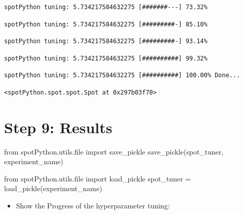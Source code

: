 \documentclass[
  letterpaper,
  DIV=11,
  numbers=noendperiod]{scrreprt}
\newenvironment{Shaded}{\begin{snugshade}}{\end{snugshade}}
\newcommand{\BuiltInTok}[1]{\textcolor[rgb]{0.00,0.23,0.31}{#1}}
\newcommand{\ImportTok}[1]{\textcolor[rgb]{0.00,0.46,0.62}{#1}}
\newcommand{\NormalTok}[1]{\textcolor[rgb]{0.00,0.23,0.31}{#1}}
\newcommand{\OperatorTok}[1]{\textcolor[rgb]{0.37,0.37,0.37}{#1}}
\providecommand{\tightlist}{%
  \setlength{\itemsep}{0pt}\setlength{\parskip}{0pt}}\usepackage{longtable,booktabs,array}
\begin{document}
\begin{verbatim}
spotPython tuning: 5.734217584632275 [#######---] 73.32% 
\end{verbatim}

\begin{verbatim}
spotPython tuning: 5.734217584632275 [#########-] 85.10% 
\end{verbatim}

\begin{verbatim}
spotPython tuning: 5.734217584632275 [#########-] 93.14% 
\end{verbatim}

\begin{verbatim}
spotPython tuning: 5.734217584632275 [##########] 99.32% 
\end{verbatim}

\begin{verbatim}
spotPython tuning: 5.734217584632275 [##########] 100.00% Done...
\end{verbatim}

\begin{verbatim}
<spotPython.spot.spot.Spot at 0x297b03f70>
\end{verbatim}

\hypertarget{sec-results-tuning-10}{%
\section{Step 9: Results}\label{sec-results-tuning-10}}

\begin{Shaded}
\begin{Highlighting}[]
\ImportTok{from}\NormalTok{ spotPython.utils.}\BuiltInTok{file} \ImportTok{import}\NormalTok{ save\_pickle}
\NormalTok{save\_pickle(spot\_tuner, experiment\_name)}
\end{Highlighting}
\end{Shaded}

\begin{Shaded}
\begin{Highlighting}[]
\ImportTok{from}\NormalTok{ spotPython.utils.}\BuiltInTok{file} \ImportTok{import}\NormalTok{ load\_pickle}
\NormalTok{spot\_tuner }\OperatorTok{=}\NormalTok{ load\_pickle(experiment\_name)}
\end{Highlighting}
\end{Shaded}

\begin{itemize}
\tightlist
\item
  Show the Progress of the hyperparameter tuning:
\end{itemize}
\end{document}

